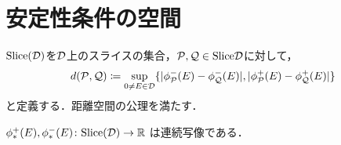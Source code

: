 \section{安定性条件の空間}
\begin{defn}
$\mathrm{Slice({\mathcal D})}$を${\mathcal D}$上のスライスの集合，$\mathcal P,\mathcal Q\in\mathrm{Slice} {\mathcal D}$に対して，
\[d(\mathcal P,\mathcal Q)\coloneq\sup_{0\neq E\in{\mathcal D}}\{|\phi^-_{{\mathcal P}}(E)-\phi_{{\mathcal Q}}^-(E)|,|\phi^+_{{\mathcal P}}(E)-\phi_{{\mathcal Q}}^+(E)|\}\]
と定義する．距離空間の公理を満たす．
\end{defn}
\begin{lemm}
	$\phi_{*}^+(E),\phi_{*}^-(E)\colon \mathrm{Slice({\mathcal D})}\rightarrow{\mathbb R}$
	は連続写像である．
\end{lemm}
